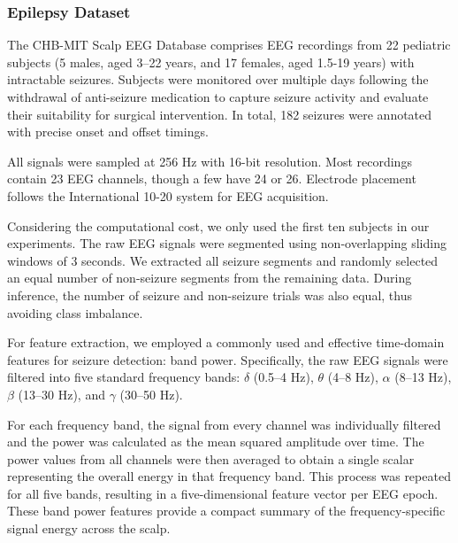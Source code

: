 \documentclass[journal,twocolumn]{IEEEtran}
\begin{document}
\subsubsection{Epilepsy Dataset}
The CHB-MIT Scalp EEG Database comprises EEG recordings from 22 pediatric subjects (5 males, aged 3–22 years, and 17 females, aged 1.5-19 years) with intractable seizures. Subjects were monitored over multiple days following the withdrawal of anti-seizure medication to capture seizure activity and evaluate their suitability for surgical intervention. In total, 182 seizures were annotated with precise onset and offset timings.

All signals were sampled at 256 Hz with 16-bit resolution. Most recordings contain 23 EEG channels, though a few have 24 or 26. Electrode placement follows the International 10-20 system for EEG acquisition.

Considering the computational cost, we only used the first ten subjects in our experiments. The raw EEG signals were segmented using non-overlapping sliding windows of 3 seconds. We extracted all seizure segments and randomly selected an equal number of non-seizure segments from the remaining data. During inference, the number of seizure and non-seizure trials was also equal, thus avoiding class imbalance.

For feature extraction, we employed a commonly used and effective time-domain features for seizure detection: band power. Specifically, the raw EEG signals were filtered into five standard frequency bands: $\delta$ (0.5–4 Hz), $\theta$ (4–8 Hz), $\alpha$ (8–13 Hz), $\beta$ (13–30 Hz), and $\gamma$ (30–50 Hz). 

For each frequency band, the signal from every channel was individually filtered and the power was calculated as the mean squared amplitude over time. The power values from all channels were then averaged to obtain a single scalar representing the overall energy in that frequency band. This process was repeated for all five bands, resulting in a five-dimensional feature vector per EEG epoch. These band power features provide a compact summary of the frequency-specific signal energy across the scalp.
\end{document}

